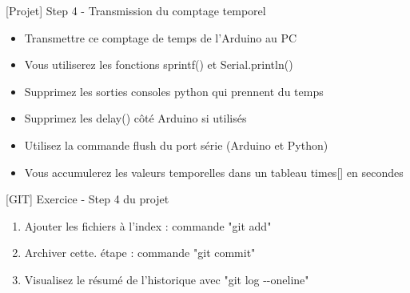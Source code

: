 \documentclass[a4paper,11pt]{beamer}
\newcounter{exampleBlockCounter}
\begin{document}
\begin{frame}
\begin{exampleblock}{[Projet] Step 4 - Transmission du comptage temporel}
\begin{itemize}
\item Transmettre ce comptage de temps de l'Arduino au PC
\item Vous utiliserez les fonctions sprintf() et Serial.println()
\item Supprimez les sorties consoles python qui prennent du temps
\item Supprimez les delay() côté Arduino si utilisés
\item Utilisez la commande flush du port série (Arduino et Python)
\item Vous accumulerez les valeurs temporelles dans un tableau times[] en secondes
\end{itemize}
\end{exampleblock}

\begin{exampleblock}{[GIT] Exercice  - Step 4 du projet} 
\begin{enumerate}
    \item Ajouter les fichiers à l'index : commande "git add"
    \item Archiver cette.
     étape : commande "git commit"
     \item Visualisez le résumé de l'historique avec "git log -{}-oneline" 
\end{enumerate}
\end{exampleblock}
\end{frame}
\end{document}
